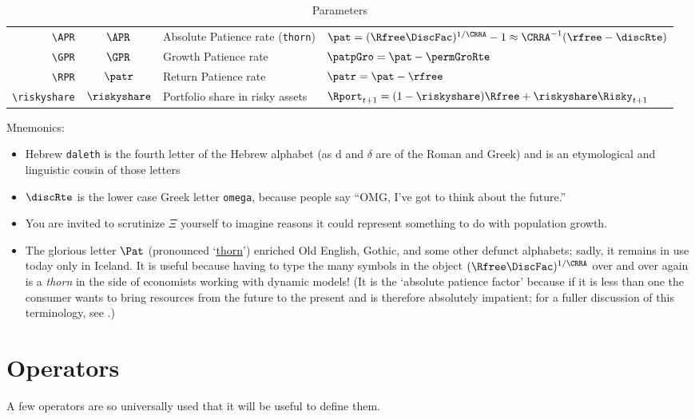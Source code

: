 \documentclass[12pt]{\econtex}
\begin{document}
\begin{table}[ht]
\begin{tabular}{|>{\ttfamily}rcll|}
    \\ \verb|\APR|  & $\APR$ & Absolute Patience rate (\texttt{thorn}) & $\pat = (\Rfree \DiscFac)^{1/\CRRA}-1 \approx \CRRA^{-1}(\rfree-\discRte) $
    \\ \verb|\GPR| & $\GPR$ & Growth Patience rate  & $\patpGro = \pat -\permGroRte $
    \\ \verb|\RPR| & $\patr$ & Return Patience rate  & $\patr =\pat -\rfree $
    \\ \verb|\riskyshare|  & $\riskyshare$ & Portfolio share in risky assets & $\Rport_{t+1}=(1-\riskyshare)\Rfree+\riskyshare\Risky_{t+1}$
    \\	\hline
  \end{tabular}
  \caption{Parameters}
  \label{table:Parameters}
\end{table}	

Mnemonics:
\begin{itemize}
\item Hebrew \texttt{daleth} is the fourth letter of the Hebrew alphabet (as d and $\delta$ are of the Roman and Greek) and is an etymological and linguistic cousin of those letters
\item $\discRte$ is the lower case Greek letter \texttt{omega}, because people say ``OMG, I've got to think about the future.''
\item You are invited to scrutinize $\Xi$ yourself to imagine reasons it could represent something to do with population growth.  
\item The glorious letter $\Pat$ (pronounced `\href{http://en.wikipedia.org/wiki/Thorn_(letter)}{thorn}') enriched Old English, Gothic, and some other defunct alphabets; sadly, it remains in use today only in Iceland.  It is useful because having to type the many symbols in the object $(\Rfree \DiscFac)^{1/\CRRA}$ over and over again is a \textit{thorn} in the side of economists working with dynamic models!  (It is the `absolute patience factor' because if it is less than one the consumer wants to bring resources from the future to the present and is therefore absolutely impatient; for a fuller discussion of this terminology, see \cite{carrollTractable}.)
\end{itemize}


\hypertarget{Operators}{}
\section{Operators}
A few operators are so universally used that it will be useful to define them.
\end{document}
